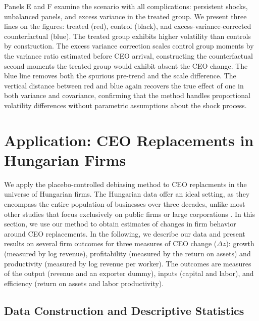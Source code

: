 \documentclass[11pt,a4paper]{article}
\begin{document}
Panels E and F examine the scenario with all complications: persistent shocks, unbalanced panels, and excess variance in the treated group. We present three lines on the figures: treated (red), control (black), and excess-variance-corrected counterfactual (blue). The treated group exhibits higher volatility than controls by construction. The excess variance correction scales control group moments by the variance ratio estimated before CEO arrival, constructing the counterfactual second moments the treated group would exhibit absent the CEO change. The blue line removes both the spurious pre-trend and the scale difference. The vertical distance between red and blue again recovers the true effect of one in both variance and covariance, confirming that the method handles proportional volatility differences without parametric assumptions about the shock process.

\section{Application: CEO Replacements in Hungarian Firms}

We apply the placebo-controlled debiasing method to CEO replacments in the universe of Hungarian firms. The Hungarian data offer an ideal setting, as they encompass the entire population of businesses over three decades, unlike most other studies that focus exclusively on public firms or large corporations \citep{Bertrand2003-io, crossland2011differences, quigley2015has}. In this section, we use our method to obtain estimates of changes in firm behavior around CEO replacements. In the following, we describe our data and present results on several firm outcomes for three measures of CEO change ($\Delta z$): growth (measured by log revenue), profitability (measured by the return on assets) and productivity (measured by log revenue per worker). The outcomes are measures of the output (revenue and an exporter dummy), inputs (capital and labor), and efficiency (return on assets and labor productivity).

\subsection{Data Construction and Descriptive Statistics}
\end{document}
